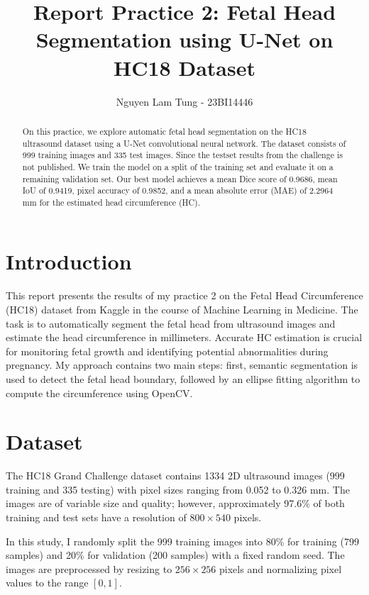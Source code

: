 \documentclass[conference]{IEEEtran}
\title{Report Practice 2: Fetal Head Segmentation using U-Net on HC18 Dataset}
\author{Nguyen Lam Tung - 23BI14446}
\begin{document}
\maketitle

\begin{abstract}
On this practice, we explore automatic fetal head segmentation on the HC18 ultrasound dataset using a U-Net convolutional neural network. The dataset consists of 999 training images and 335 test images. Since the testset results from the challenge is not published. We train the model on a split of the training set and evaluate it on a remaining validation set. Our best model achieves a mean Dice score of 0.9686, mean IoU of 0.9419, pixel accuracy of 0.9852, and a mean absolute error (MAE) of 2.2964 mm for the estimated head circumference (HC).
\end{abstract}

\section{Introduction}

This report presents the results of my practice 2 on the Fetal Head Circumference (HC18) dataset from Kaggle in the course of Machine Learning in Medicine. The task is to automatically segment the fetal head from ultrasound images and estimate the head circumference in millimeters. Accurate HC estimation is crucial for monitoring fetal growth and identifying potential abnormalities during pregnancy. My approach contains two main steps: first, semantic segmentation is used to detect the fetal head boundary, followed by an ellipse fitting algorithm to compute the circumference using OpenCV.

\section{Dataset}

The HC18 Grand Challenge dataset \cite{vandenheuvel2018automated} contains 1334 2D ultrasound images (999 training and 335 testing) with pixel sizes ranging from 0.052 to 0.326 mm. The images are of variable size and quality; however, approximately 97.6\% of both training and test sets have a resolution of $800 \times 540$ pixels.

In this study, I randomly split the 999 training images into 80\% for training (799 samples) and 20\% for validation (200 samples) with a fixed random seed. The images are preprocessed by resizing to $256 \times 256$ pixels and normalizing pixel values to the range $[0, 1]$.
\end{document}
